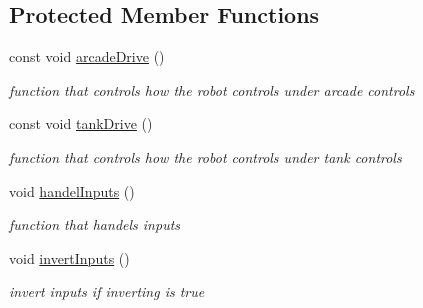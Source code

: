 \subsection*{Protected Member Functions}
\begin{DoxyCompactItemize}
\item 
\mbox{\label{class_basic_drive_controller_ae934462a6e905bd1660cdf6c307d779e}} 
const void \mbox{\hyperlink{class_basic_drive_controller_ae934462a6e905bd1660cdf6c307d779e}{arcade\+Drive}} ()
\begin{DoxyCompactList}\small\item\em function that controls how the robot controls under arcade controls \end{DoxyCompactList}\item 
\mbox{\label{class_basic_drive_controller_ac454ab3b1872cc84138f29c4574680ef}} 
const void \mbox{\hyperlink{class_basic_drive_controller_ac454ab3b1872cc84138f29c4574680ef}{tank\+Drive}} ()
\begin{DoxyCompactList}\small\item\em function that controls how the robot controls under tank controls \end{DoxyCompactList}\item 
\mbox{\label{class_basic_drive_controller_a6c5c51282655efdf990d6d01f7a36449}} 
void \mbox{\hyperlink{class_basic_drive_controller_a6c5c51282655efdf990d6d01f7a36449}{handel\+Inputs}} ()
\begin{DoxyCompactList}\small\item\em function that handels inputs \end{DoxyCompactList}\item 
\mbox{\label{class_basic_drive_controller_a02d070214ca3ae4153b36d46b4b71318}} 
void \mbox{\hyperlink{class_basic_drive_controller_a02d070214ca3ae4153b36d46b4b71318}{invert\+Inputs}} ()
\begin{DoxyCompactList}\small\item\em invert inputs if inverting is true \end{DoxyCompactList}\end{DoxyCompactItemize}
